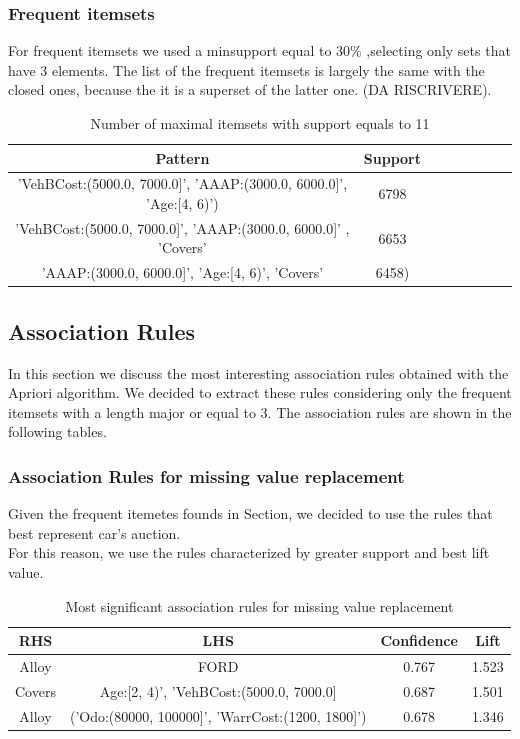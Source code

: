\documentclass{article}
\begin{document}
	\subsubsection{Frequent itemsets}
	
	For frequent itemsets we used a minsupport equal to 30\% ,selecting only sets that have 3 elements. The list of the frequent itemsets is largely the same with the closed ones, because the  it is a superset of the latter one. (DA RISCRIVERE). 
	
	\begin{table}[H]
		\centering
		\begin{tabular}{c|ccccccc}
			\hline
			Pattern & Support \\
			\hline
			\rowcolor{Gray}
			'VehBCost:(5000.0, 7000.0]', 'AAAP:(3000.0, 6000.0]',  'Age:[4, 6)') & 6798 \\
			'VehBCost:(5000.0, 7000.0]', 'AAAP:(3000.0, 6000.0]' ,  'Covers'  & 6653 \\
			\rowcolor{Gray}
			'AAAP:(3000.0, 6000.0]', 'Age:[4, 6)', 'Covers' & 6458) \\
		\end{tabular}
		\caption{Number of maximal itemsets with support equals to 11}
	\end{table}
	
	\subsection{Association Rules}
	In this section we discuss the most interesting association rules obtained with the Apriori algorithm. 
	We decided to extract these rules considering only the frequent itemsets with a length major or equal to 3. 
	The association rules are shown in the following tables.  
	
	\subsubsection{Association Rules for missing value replacement}
	
	Given the frequent itemetes founds in Section, we decided to use the rules that best represent car's auction.\\
	For this reason, we use the rules characterized by greater support and best lift value.
	
	
	\begin{table}[H]
		\centering
		\begin{tabular}{|cc|cc|}
			\hline
			\textbf{RHS} & \textbf{LHS} & \textbf{Confidence} & \textbf{Lift} \\
			\hline
			\rowcolor{Gray}
			Alloy & FORD  & 0.767 & 1.523 \\
			Covers & Age:[2, 4)', 'VehBCost:(5000.0, 7000.0]  & 0.687 & 1.501 \\
			\rowcolor{Gray}
			Alloy &  ('Odo:(80000, 100000]', 'WarrCost:(1200, 1800]') &  0.678 & 1.346 \\
			\hline
		\end{tabular}
		\caption{Most significant association rules for missing value replacement}
	\end{table}
	
\end{document}

